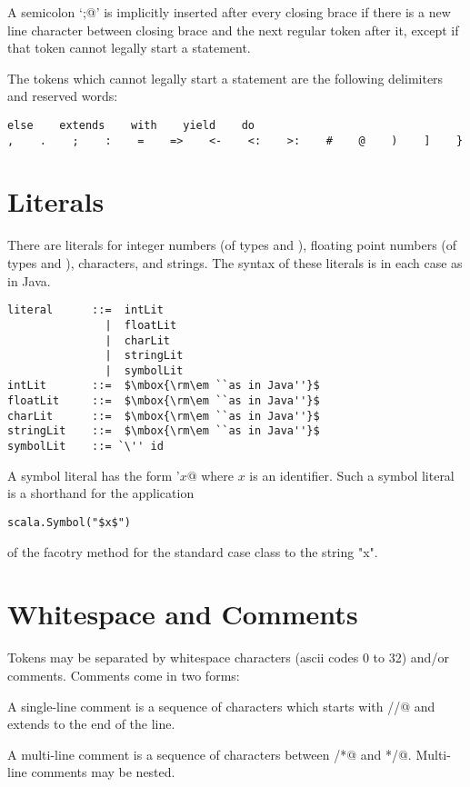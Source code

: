 \documentclass[a4paper,12pt,twoside,titlepage]{book}
\begin{document}
A semicolon `\lstinline@;@' is implicitly inserted after every closing brace
if there is a new line character between closing brace and the next
regular token after it, except if that token cannot legally start a
statement.

The tokens which cannot legally start a statement
are the following delimiters and reserved words:
\begin{lstlisting}
else    extends    with    yield    do
,    .    ;    :    =    =>    <-    <:    >:    #    @    )    ]    }
\end{lstlisting}

\section{Literals}

There are literals for integer numbers (of types  and ),
floating point numbers (of types  and ), characters, and
strings.  The syntax of these literals is in each case as in Java.

\syntax\begin{lstlisting}
literal      ::=  intLit
               |  floatLit
               |  charLit
               |  stringLit
               |  symbolLit
intLit       ::=  $\mbox{\rm\em ``as in Java''}$
floatLit     ::=  $\mbox{\rm\em ``as in Java''}$
charLit      ::=  $\mbox{\rm\em ``as in Java''}$
stringLit    ::=  $\mbox{\rm\em ``as in Java''}$
symbolLit    ::= `\'' id
\end{lstlisting}

A symbol literal has the form \lstinline@'$x$@ where $x$ is an identifier.
Such a symbol literal is a  shorthand for the application
\begin{lstlisting}
scala.Symbol("$x$")
\end{lstlisting}
of the facotry method for the standard case class  to the string "x".

\section{Whitespace and Comments}

Tokens may be separated by whitespace characters (ascii codes 0 to 32)
and/or comments. Comments come in two forms:

A single-line comment is a sequence of characters which starts with
\lstinline@//@ and extends to the end of the line.

A multi-line comment is a sequence of characters between \lstinline@/*@ and
\lstinline@*/@. Multi-line comments may be nested.
\end{document}
